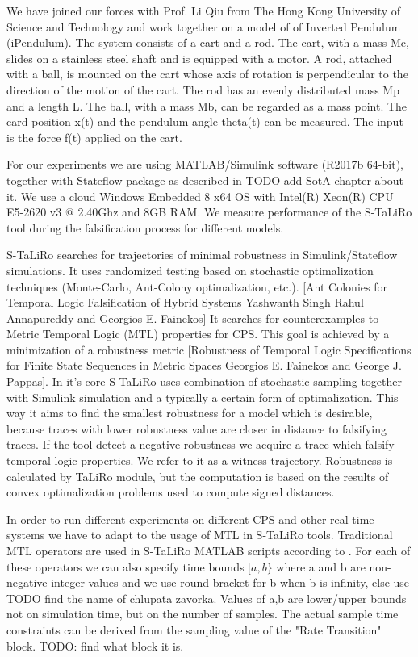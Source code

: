 We have joined our forces with Prof. Li Qiu from The Hong Kong University of Science and Technology and work together on a model of of Inverted Pendulum (iPendulum). The system consists of a cart and a rod. The cart, with a mass Mc, slides on a stainless steel shaft and is equipped with a motor. A rod, attached with a ball, is mounted on the cart whose axis of rotation is perpendicular to the direction of the motion of the cart. The rod has an evenly distributed mass Mp and a length L. The ball, with a mass Mb, can be regarded as a mass point. The card position x(t) and the pendulum angle theta(t) can be measured. The input is the force f(t) applied on the cart.

For our experiments we are using MATLAB/Simulink software (R2017b 64-bit), together with Stateflow package as described in {TODO add SotA chapter about it}. We use a cloud Windows Embedded 8 x64 OS with Intel(R) Xeon(R) CPU E5-2620 v3 @ 2.40Ghz and 8GB RAM. We measure performance of the S-TaLiRo tool during the falsification process for different models.

S-TaLiRo searches for trajectories of minimal robustness in Simulink/Stateflow simulations. It uses randomized testing based on stochastic optimalization techniques (Monte-Carlo, Ant-Colony optimalization, etc.). [Ant Colonies for Temporal Logic Falsification of Hybrid Systems Yashwanth Singh Rahul Annapureddy and Georgios E. Fainekos] It searches for counterexamples to Metric Temporal Logic (MTL) properties for CPS. This goal is achieved by a minimization of a robustness metric [Robustness of Temporal Logic Specifications for Finite State Sequences in Metric Spaces Georgios E. Fainekos and George J. Pappas]. In it's core S-TaLiRo uses combination of stochastic sampling together with Simulink simulation and a typically a certain form of optimalization. This way it aims to find the smallest robustness for a model which is desirable, because traces with lower robustness value are closer in distance to falsifying traces. If the tool detect a negative robustness we acquire a trace which falsify temporal logic properties. We refer to it as a witness trajectory. Robustness is calculated by TaLiRo module, but the computation is based on the results of convex optimalization problems used to compute signed distances.

In order to run different experiments on different CPS and other real-time systems we have to adapt to the usage of MTL in S-TaLiRo tools. Traditional MTL operators are used in S-TaLiRo MATLAB scripts according to . For each of these operators we can also specify time bounds $[a,b\}$ where a and b are non-negative integer values and we use round bracket for b when b is infinity, else use TODO find the name of chlupata zavorka. Values of a,b are lower/upper bounds not on simulation time, but on the number of samples. The actual sample time constraints can be derived from the sampling value of the "Rate Transition" block. TODO: find what block it is.

